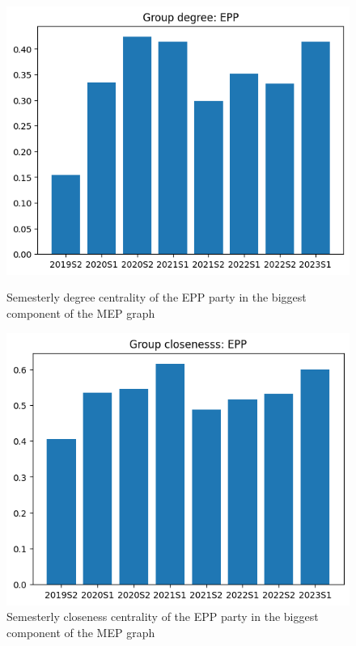 \documentclass[lettersize,journal]{IEEEtran}
\begin{document}
\begin{figure}[h]
  \centering
  \begin{minipage}[b]{0.23\textwidth}
    \includegraphics[width=\textwidth]{EPP_HY_deg.png}
    \caption{Semesterly degree centrality of the EPP party in the biggest component of the MEP graph}
    \label{EPP_HY_deg}
  \end{minipage}
  \hfill
  \begin{minipage}[b]{0.23\textwidth}
    \includegraphics[width=\textwidth]{EPP_HY_cls.png}
    \caption{Semesterly closeness centrality of the EPP party in the  biggest component of the MEP graph}
    \label{EPP_HY_cls}
  \end{minipage}
\end{figure}
\end{document}
